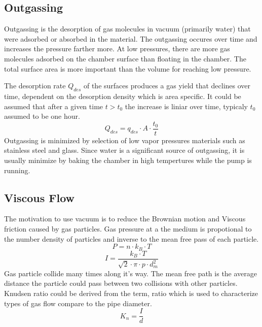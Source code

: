 \documentclass[\main/master.tex]{subfiles}
\begin{document}
\subsection{Outgassing}
Outgassing is the desorption of gas molecules in vacuum (primarily water)  that were adsorbed or absorbed in the material. The outgassing occures over time and increases the pressure farther more. At low pressures, there are more gas molecules adsorbed on the chamber surface than floating in the chamber. The total surface area is more important than the volume for reaching low pressure. 
\par
The desorption rate $Q_{des}$ of the surfaces produces a gas yield that declines over time, dependent on the desorption density which is area specific. It could be assumed that after a given time $t>t_0$ the increase is liniar over time, typicaly $t_0$ assumed to be one hour.
\begin{equation}
Q_{des} = q_{des}\cdot A\cdot\frac{t_0}{t}  \label{eqn:energy-mass-equivalence-relation}
\end{equation}
Outgassing is minimized by selection of low vapor pressures materials such as stainless steel and glass. Since water is a significant source of outgassing, it is usually minimize by baking the chamber in high tempertures while the pump is running.



\subsection{Viscous Flow}
The motivation to use vacuum is to reduce the Brownian motion and Viscous friction caused by gas particles. Gas pressure at a the medium is propotional to the number density of particles and inverse to the mean free pass of each particle.    
\begin{equation}
P = n\cdot k_B\cdot T  \label{eqn:ideal-gasses}
\end{equation}
\begin{equation}
I = \frac{k_B\cdot T}{\sqrt{2}\cdot\pi\cdot p\cdot d_m^2}     \label{eqn:mean-free-pass}
\end{equation}
Gas particle collide many times along it's way. The mean free path is the average distance the particle could pass between two collisions with other particles. Knudsen ratio could be derived from the term, ratio which is used to characterize types of gas flow compare to the pipe diameter.
\begin{equation}
K_n = \frac{I}{d}     \label{eqn:mean-free-pass}
\end{equation}
\end{document}
